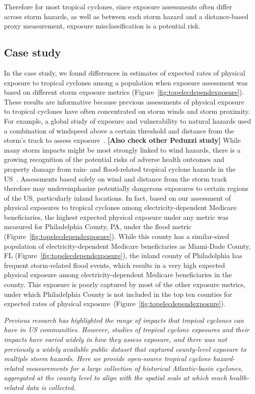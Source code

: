 Therefore for most tropical cyclones, since exposure assessments often differ
across storm hazards, as well as between each storm hazard and a distance-based
proxy measurement, exposure misclassification is a potential risk.

\subsection*{Case study}

In the case study, we found differences in estimates of expected rates of
physical exposure to tropical cyclones among a population when exposure
assessment was based on different storm exposure metrics
(Figure~\ref{fig:topelecdependexposure}).  These results are informative
because previous assessments of physical exposure to tropical cyclones have
often concentrated on storm winds and storm proximity. For example, a global
study of exposure and vulnerability to natural hazards used a combination of
windspeed above a certain threshold and distance from the storm's track to
assess exposure~\parencite{peduzzi2009assessing}. \textbf{[Also check other
Peduzzi study]}  While many storm impacts might be most strongly linked to wind
hazards, there is a growing recognition of the potential risks of adverse
health outcomes and property damage from rain- and flood-related tropical
cyclone hazards in the \ac{US}~\parencite{smith2009}.  Assessments based solely
on wind and distance from the storm track therefore may underemphasize
potentially dangerous exposures to certain regions of the \ac{US}, particularly
inland locations.  In fact, based on our assessment of physical exposures to
tropical cyclones among electricity-dependent Medicare beneficiaries, the
highest expected physical exposure under any metric was measured for
Philadelphia County, PA, under the flood metric
(Figure~\ref{fig:topelecdependexposure}).  While this county has a
similar-sized population of electricity-dependent Medicare beneficiaries as
Miami-Dade County, FL (Figure~\ref{fig:topelecdependexposure}), the inland
county of Philadelphia has frequent storm-related flood events, which results
in a very high expected physical exposure among electricity-dependent Medicare
beneficiaries in the county. This exposure is poorly captured by most of the
other exposure metrics, under which Philadelphia County is not included in the
top ten counties for expected rates of physical
exposure~(Figure~\ref{fig:topelecdependexposure}).


\textit{Previous research has highlighted the range of impacts that tropical cyclones
can have in \ac{US} communities. However, studies of tropical cyclone exposures
and their impacts have varied widely in how they assess exposure, and there was
not previously a widely available public dataset that captured county-level
exposure to multiple storm hazards. Here we provide open-source tropical
cyclone hazard-related measurements for a large collection of historical
Atlantic-basin cyclones, aggregated at the county level to align with the
spatial scale at which much health-related data is collected.}

